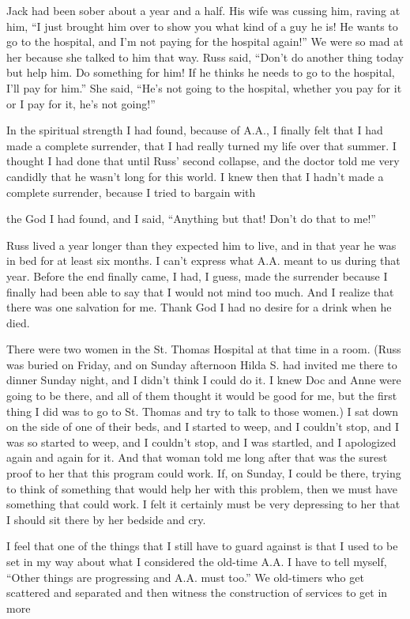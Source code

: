 Jack had been sober about a year and a half. His wife was cussing him, raving at him, “I just brought him over to show you what kind of a guy he is! He wants to go to the hospital, and I’m not paying for the hospital again!” We were so mad at her because she talked to him that way. Russ said, “Don’t do another thing today but help him. Do something for him! If he thinks he needs to go to the hospital, I’ll pay for him.” She said, “He’s not going to the hospital, whether you pay for it or I pay for it, he’s not going!”

In the spiritual strength I had found, because of A.A., I finally felt that I had made a complete surrender, that I had really turned my life over that summer. I thought I had done that until Russ’ second collapse, and the doctor told me very candidly that he wasn’t long for this world. I knew then that I hadn’t made a complete surrender, because I tried to bargain with

the God I had found, and I said, “Anything but that! Don’t do that to me!”

Russ lived a year longer than they expected him to live, and in that year he was in bed for at least six months. I can’t express what A.A. meant to us during that year. Before the end finally came, I had, I guess, made the surrender because I finally had been able to say that I would not mind too much. And I realize that there was one salvation for me. Thank God I had no desire for a drink when he died.

There were two women in the St. Thomas Hospital at that time in a room. (Russ was buried on Friday, and on Sunday afternoon Hilda S. had invited me there to dinner Sunday night, and I didn’t think I could do it. I knew Doc and Anne were going to be there, and all of them thought it would be good for me, but the first thing I did was to go to St. Thomas and try to talk to those women.) I sat down on the side of one of their beds, and I started to weep, and I couldn’t stop, and I was so started to weep, and I couldn’t stop, and I was startled, and I apologized again and again for it. And that woman told me long after that was the surest proof to her that this program could work. If, on Sunday, I could be there, trying to think of something that would help her with this problem, then we must have something that could work. I felt it certainly must be very depressing to her that I should sit there by her bedside and cry.

I feel that one of the things that I still have to guard against is that I used to be set in my way about what I considered the old-time A.A. I have to tell myself, “Other things are progressing and A.A. must too.” We old-timers who get scattered and separated and then witness the construction of services to get in more

